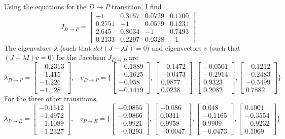 \documentclass[11pt]{article}
\begin{document}
Using the equations for the $D\to P$ transition, I find
\[
J_{D\to P}=\begin{bmatrix}
-1 & 0.3157 & 0.0729 & 0.1700\\
0.2751 & -1 & 0.0579 & 0.1231\\
2.645 & 0.8034 & -1 & 0.7493\\
0.2133 & 0.2297 & 0.0328 & -1
\end{bmatrix}\]
The eigenvalues $\lambda$ (such that $det(J-\lambda I)=0$) and eigenvectors $v$ (such that $(J-\lambda I)v=0$) for the Jacobian $J_{D \to P}$ are
\[\lambda_{D \to P}=\begin{bmatrix}-0.2313\\-1.415\\-1.226\\-1.128\end{bmatrix}
\text{,} \quad
v_{D \to P}= \Biggl\{\begin{bmatrix}-0.1889\\-0.1625\\-0.958\\-0.1419\end{bmatrix},
\begin{bmatrix}-0.1472\\-0.0473\\0.9877\\0.0238\end{bmatrix}, 
\begin{bmatrix}-0.0501\\-0.2914\\0.9323\\0.2082\end{bmatrix}, 
\begin{bmatrix}-0.1212\\-0.2483\\-0.5499\\0.7882\end{bmatrix} \Biggr\}
\]
For the three other transitions,
\[\lambda_{P \to E}=\begin{bmatrix}-0.1612\\-1.4972\\-1.1089\\-1.2327\end{bmatrix}
\text{,} \quad
v_{P \to E}= \Biggl\{\begin{bmatrix}-0.0855\\-0.0866\\-0.9921\\-0.0293\end{bmatrix},
\begin{bmatrix}-0.086\\0.0311\\0.9958\\-0.0047\end{bmatrix}, 
\begin{bmatrix}0.048\\-0.1165\\0.9909\\-0.0473\end{bmatrix}, 
\begin{bmatrix}0.1001\\-0.3554\\-0.9232\\0.1069\end{bmatrix} \Biggr\}
\]
\end{document}
